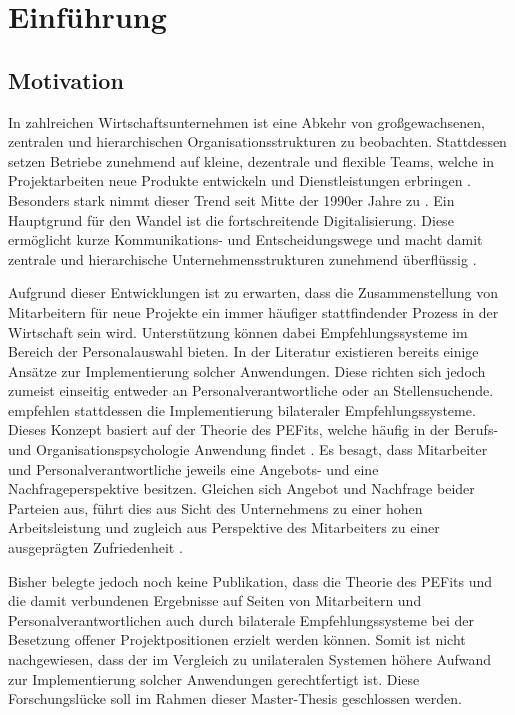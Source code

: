 \chapter{Einführung}
\label{ch:intro}

\section{Motivation}
\label{sec:intro:motivation}
In zahlreichen Wirtschaftsunternehmen ist eine Abkehr von großgewachsenen, zentralen und hierarchischen Organisationsstrukturen zu beobachten. Stattdessen setzen Betriebe zunehmend auf kleine, dezentrale und flexible Teams, welche in Projektarbeiten neue Produkte entwickeln und Dienstleistungen erbringen \cite[S. 2f.]{elanceEconomy:1999}. Besonders stark nimmt dieser Trend seit Mitte der 1990er Jahre zu \cite[S. 8]{whittington:1999}. Ein Hauptgrund für den Wandel ist die fortschreitende Digitalisierung. Diese ermöglicht kurze Kommunikations- und Entscheidungswege und macht damit zentrale und hierarchische Unternehmensstrukturen zunehmend überflüssig \cite[S. 5]{elanceEconomy:1999}.

Aufgrund dieser Entwicklungen ist zu erwarten, dass die Zusammenstellung von Mitarbeitern für neue Projekte ein immer häufiger stattfindender Prozess in der Wirtschaft sein wird. Unterstützung können dabei Empfehlungssysteme im Bereich der Personalauswahl bieten. In der Literatur existieren bereits einige Ansätze zur Implementierung solcher Anwendungen. Diese richten sich jedoch zumeist einseitig entweder an Personalverantwortliche oder an Stellensuchende. \textcite[S. 1ff.]{malinowski:2006} empfehlen stattdessen die Implementierung bilateraler Empfehlungssysteme. Dieses Konzept basiert auf der Theorie des \aclp{PEFit}, welche häufig in der Berufs- und Organisationspsychologie Anwendung findet \cite[S. 2]{guan:2021}\cite[S. 3.f]{malinowski:2006}. Es besagt, dass Mitarbeiter und Personalverantwortliche jeweils eine Angebots- und eine Nachfrageperspektive besitzen. Gleichen sich Angebot und Nachfrage beider Parteien aus, führt dies aus Sicht des Unternehmens zu einer hohen Arbeitsleistung und zugleich aus Perspektive des Mitarbeiters zu einer ausgeprägten Zufriedenheit \cite[S. 6]{su:2015}.

Bisher belegte jedoch noch keine Publikation, dass die Theorie des \aclp{PEFit} und die damit verbundenen Ergebnisse auf Seiten von Mitarbeitern und Personalverantwortlichen auch durch bilaterale Empfehlungssysteme bei der Besetzung offener Projektpositionen erzielt werden können. Somit ist nicht nachgewiesen, dass der im Vergleich zu unilateralen Systemen höhere Aufwand zur Implementierung solcher Anwendungen gerechtfertigt ist. Diese Forschungslücke soll im Rahmen dieser Master-Thesis geschlossen werden.

